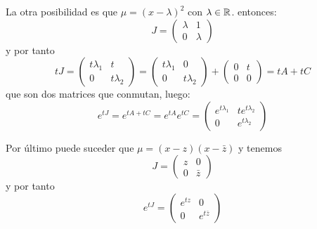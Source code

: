 \begin{ejemplo}
           La otra posibilidad es que \(\mu={(x-\lambda)}^2\) con \(\lambda\in\mathbb{R}\).
           entonces:
           \[
             J=\begin{pmatrix}
                 \lambda& 1\\
                 0&         \lambda
               \end{pmatrix}
             \]
             y por tanto
             \[
               tJ=\begin{pmatrix}
                    {t\lambda_1}& t\\
                    0&         {t\lambda_2}
                  \end{pmatrix}=
                  \begin{pmatrix}
                    {t\lambda_1}& 0\\
                    0&         {t\lambda_2}
                  \end{pmatrix}
                  +
                  \begin{pmatrix}
                    0& t\\
                    0& 0
                  \end{pmatrix}
                  =
                  tA+tC
                \]
                que son dos matrices que conmutan, luego:
                \[
                  e^{tJ}=
                  e^{tA+tC}=
                  e^{tA}e^{tC}
                  =
                  \begin{pmatrix}
                    e^{t\lambda_1}& te^{t\lambda_2}\\
                    0&         e^{t\lambda_2}
                  \end{pmatrix}
                \]

                Por último puede suceder que \(\mu=(x-z)(x-\bar{z})\) y tenemos
                \[
                  J=\begin{pmatrix}
                      z & 0\\
                      0&  \bar{z}
                    \end{pmatrix}
                  \]
                  y por tanto
                  \[
                    e^{tJ}=\begin{pmatrix}
                             e^{tz}& 0\\
                             0&         e^{t\bar{z}}
                           \end{pmatrix}
                         \]


\end{ejemplo}
